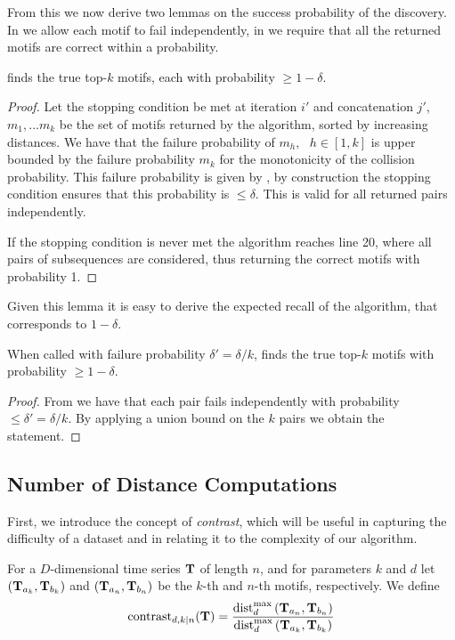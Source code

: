 From this we now derive two lemmas on the success probability of the discovery.
In  we allow each motif to fail independently, in  we require that all the returned motifs are correct within a probability.
\begin{lemma}
    \label{lemma:topk}
     finds the true top-$k$ motifs, each with probability $\geq 1-\delta$.
\end{lemma}
\begin{proof}
    Let the stopping condition be met at iteration $i'$ and concatenation $j'$, $m_1,...m_k$ be the set of motifs returned by the algorithm, sorted by increasing distances. We have that the failure probability of $m_h,\text{ } h\in[1,k]$ is upper bounded by the failure probability $m_k$ for the monotonicity of the collision probability. This failure probability is given by , by construction the stopping condition ensures that this probability is $\leq \delta$. This is valid for all returned pairs independently. 

    If the stopping condition is never met the algorithm reaches line 20, 
    where all pairs of subsequences are considered, thus returning the correct motifs with probability 1.
\end{proof}
Given this lemma it is easy to derive the expected recall of the algorithm, that corresponds to $1-\delta$.
\begin{lemma}
\label{lemma:topkdip}
    When called with failure probability $\delta'=\delta / k$,  finds the true top-$k$ motifs with probability $\geq 1-\delta$.
\end{lemma}
\begin{proof}
    From  we have that each pair fails independently with probability $\leq \delta'= \delta /k$.
    By applying a union bound on the $k$ pairs we obtain the statement.
\end{proof}
\subsection{Number of Distance Computations}

First, we introduce the concept of \emph{contrast}, which will be useful in capturing the difficulty of a dataset and in relating it to the complexity of our algorithm.

\begin{definition}
\label{sec:contrast}
For a $D$-dimensional time series $\mathbf{T}$ of length $n$, and for parameters $k$ and $d$ let
$(\mathbf{T}_{a_k}, \mathbf{T}_{b_k})$
and
$(\mathbf{T}_{a_n}, \mathbf{T}_{b_n})$
be the $k$-th and $n$-th motifs, respectively.
We define
\[
\operatorname{contrast}_{d,k|n}(\mathbf{T}) = \frac{
  \operatorname{dist}^{\max}_{d}\left(\mathbf{T}_{a_n}, \mathbf{T}_{b_n}\right)
}{
  \operatorname{dist}^{\max}_{d}\left(\mathbf{T}_{a_k}, \mathbf{T}_{b_k}\right)
}
\]
\end{definition}


